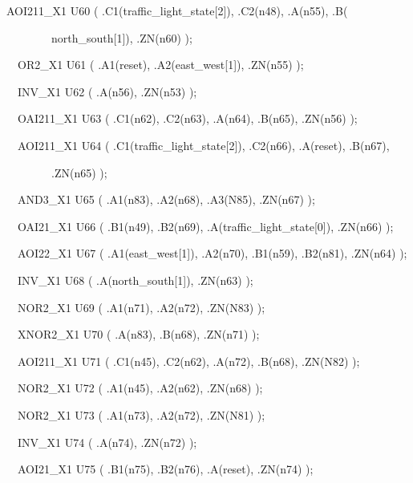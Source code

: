 \documentclass[a4paper]{article}
\begin{document}
\begin{center}
\begin{minipage}{6.01528in}
{\ttfamily\color[rgb]{0.0,0.0,0.039215688}
AOI211\_X1 U60 ( .C1(traffic\_light\_state[2]), .C2(n48), .A(n55), .B(}

{\ttfamily\color[rgb]{0.0,0.0,0.039215688}
\ \ \ \ \ \ \ \ north\_south[1]), .ZN(n60) );}

{\ttfamily\color[rgb]{0.0,0.0,0.039215688}
\ \ OR2\_X1 U61 ( .A1(reset), .A2(east\_west[1]), .ZN(n55) );}

{\ttfamily\color[rgb]{0.0,0.0,0.039215688}
\ \ INV\_X1 U62 ( .A(n56), .ZN(n53) );}

{\ttfamily\color[rgb]{0.0,0.0,0.039215688}
\ \ OAI211\_X1 U63 ( .C1(n62), .C2(n63), .A(n64), .B(n65), .ZN(n56) );}

{\ttfamily\color[rgb]{0.0,0.0,0.039215688}
\ \ AOI211\_X1 U64 ( .C1(traffic\_light\_state[2]), .C2(n66), .A(reset),
.B(n67),\ }

{\ttfamily\color[rgb]{0.0,0.0,0.039215688}
\ \ \ \ \ \ \ \ .ZN(n65) );}

{\ttfamily\color[rgb]{0.0,0.0,0.039215688}
\ \ AND3\_X1 U65 ( .A1(n83), .A2(n68), .A3(N85), .ZN(n67) );}

{\ttfamily\color[rgb]{0.0,0.0,0.039215688}
\ \ OAI21\_X1 U66 ( .B1(n49), .B2(n69), .A(traffic\_light\_state[0]),
.ZN(n66) );}

{\ttfamily\color[rgb]{0.0,0.0,0.039215688}
\ \ AOI22\_X1 U67 ( .A1(east\_west[1]), .A2(n70), .B1(n59), .B2(n81),
.ZN(n64) );}

{\ttfamily\color[rgb]{0.0,0.0,0.039215688}
\ \ INV\_X1 U68 ( .A(north\_south[1]), .ZN(n63) );}

{\ttfamily\color[rgb]{0.0,0.0,0.039215688}
\ \ NOR2\_X1 U69 ( .A1(n71), .A2(n72), .ZN(N83) );}

{\ttfamily\color[rgb]{0.0,0.0,0.039215688}
\ \ XNOR2\_X1 U70 ( .A(n83), .B(n68), .ZN(n71) );}

{\ttfamily\color[rgb]{0.0,0.0,0.039215688}
\ \ AOI211\_X1 U71 ( .C1(n45), .C2(n62), .A(n72), .B(n68), .ZN(N82) );}

{\ttfamily\color[rgb]{0.0,0.0,0.039215688}
\ \ NOR2\_X1 U72 ( .A1(n45), .A2(n62), .ZN(n68) );}

{\ttfamily\color[rgb]{0.0,0.0,0.039215688}
\ \ NOR2\_X1 U73 ( .A1(n73), .A2(n72), .ZN(N81) );}

{\ttfamily\color[rgb]{0.0,0.0,0.039215688}
\ \ INV\_X1 U74 ( .A(n74), .ZN(n72) );}

{\ttfamily\color[rgb]{0.0,0.0,0.039215688}
\ \ AOI21\_X1 U75 ( .B1(n75), .B2(n76), .A(reset), .ZN(n74) );}


\end{minipage}
\end{center}
\end{document}
